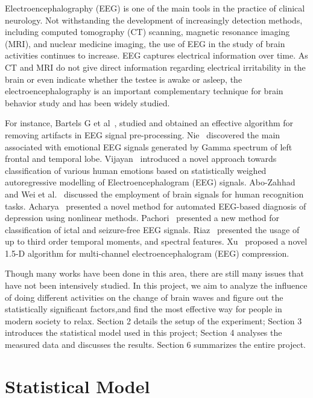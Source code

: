\documentclass[letterpaper,twocolumn,10pt]{article}
\begin{document}
Electroencephalography (EEG) is one of the main tools in the practice of clinical neurology. Not withstanding the development of increasingly detection methods, including computed tomography (CT) scanning, magnetic resonance imaging (MRI), and nuclear medicine imaging, the use of EEG in the study of brain activities continues to increase. EEG captures electrical information over time. As CT and MRI do not give direct information regarding electrical irritability in the brain or even indicate whether the testee is awake or asleep, the electroencephalography is an important complementary technique for brain behavior study and has been widely studied.

For instance, Bartels G et al~\cite{bartels2010automatic}, studied and obtained an effective algorithm for removing artifacts in EEG signal pre-processing. Nie~\cite{nie2011eeg} discovered the main associated with emotional EEG signals generated by Gamma spectrum of left frontal and temporal lobe. Vijayan~\cite{vijayan2015eeg,bashar2015identification,torres2014comparative} introduced a novel approach towards classification of various human emotions based on statistically weighed autoregressive modelling of Electroencephalogram (EEG) signals. Abo-Zahhad~\cite{abo2015state} and Wei et al.~\cite{wei2015selective} discussed the employment of brain signals for human recognition tasks. Acharya~\cite{acharya2015novel} presented a novel method for automated EEG-based diagnosis of depression using nonlinear methods. Pachori~\cite{pachori2014epileptic} presented a new method for classification of ictal and seizure-free EEG signals. Riaz~\cite{riaz2016emd} presented the usage of up to third order temporal moments, and spectral features. Xu~\cite{xu20151} proposed a novel 1.5-D algorithm for multi-channel electroencephalogram (EEG) compression.

Though many works have been done in this area, there are still many issues that have not been intensively studied. In this project, we aim to analyze the influence of doing different activities on the change of brain waves and figure out the statistically significant factors,and find the most effective way for people in modern society to relax. Section 2 details the setup of the experiment; Section 3 introduces the statistical model used in this project; Section 4 analyses the measured data and discusses the results. Section 6 summarizes the entire project.

\section{Statistical Model}
\end{document}
